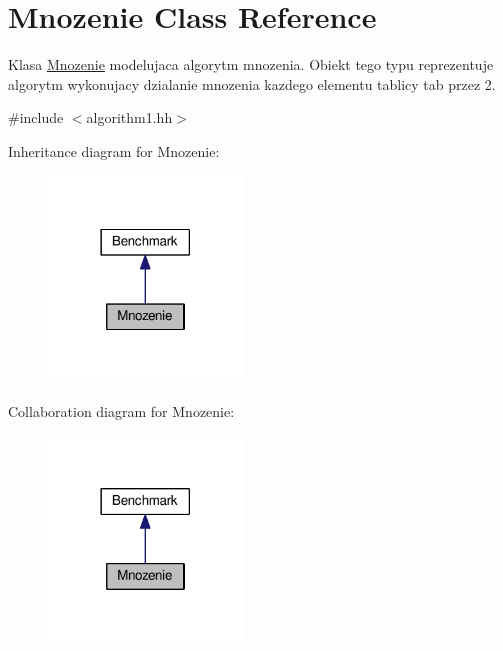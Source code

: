 \hypertarget{class_mnozenie}{\section{Mnozenie Class Reference}
\label{class_mnozenie}
}


Klasa \hyperlink{class_mnozenie}{Mnozenie} modelujaca algorytm mnozenia. Obiekt tego typu reprezentuje algorytm wykonujacy dzialanie mnozenia kazdego elementu tablicy tab przez 2.  




{\ttfamily \#include $<$algorithm1.\-hh$>$}



Inheritance diagram for Mnozenie\-:\nopagebreak
\begin{figure}[H]
\begin{center}
\leavevmode
\includegraphics[width=146pt]{class_mnozenie__inherit__graph}
\end{center}
\end{figure}


Collaboration diagram for Mnozenie\-:\nopagebreak
\begin{figure}[H]
\begin{center}
\leavevmode
\includegraphics[width=146pt]{class_mnozenie__coll__graph}
\end{center}
\end{figure}
